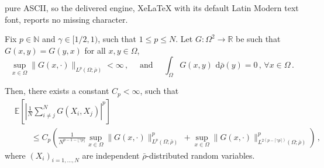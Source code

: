 \documentclass[10pt,a4paper]{amsart}
\newcommand{\N}{\mathbb{N}}
\newcommand{\R}{\mathbb{R}}
\newcommand{\dx}[1]{\,\mathrm{d}#1}  %
\begin{document}
pure ASCII, so the delivered engine, XeLaTeX with its default Latin Modern text font, reports no missing character.
\begin{lemma}\label{lem:corineq}
Fix $p \in \N$ and $\gamma \in [1/2,1)$, such that $1\le p\le N$. Let $G:\Omega^2 \to \R$ be such that $G(x,y)=G(y,x)$ for all $x,y \in \Omega$,
\begin{equation}
  \sup_{x\in \Omega}\lVert G(x,\cdot) \rVert_{L^p(\Omega;\bar\rho)} <\infty\,, \quad \textrm{ and }\quad \int_{\Omega}G(x,y) \, \dx{\bar\rho}(y)=0\,,\, \forall x \in \Omega\, .
\end{equation}

Then, there exists a constant $C_p<\infty$, such that
\begin{align}
&\mathbb{{E}}\left[\left|\frac{1}{N}\sum_{i\neq j}^{N}G(X_{i},X_{j})\right|^{p}\right]\\&\qquad \leq C_p\left(\frac{1}{N^{p-1-\lfloor \gamma p \rfloor}} \sup_{x \in \Omega} \lVert  G(x,\cdot)\rVert_{L^p(\Omega;\bar\rho)}^{p}\, +  \sup_{x \in \Omega} \lVert  G(x,\cdot)\rVert_{L^{2(p-\lceil \gamma p \rceil)}(\Omega;\bar\rho)}^{p} \right)\, ,
\label{eq:corineq}
\end{align}
where $(X_i)_{i=1,\dots,N}$ are independent $\bar\rho$-distributed random variables.
\end{lemma}
\end{document}
